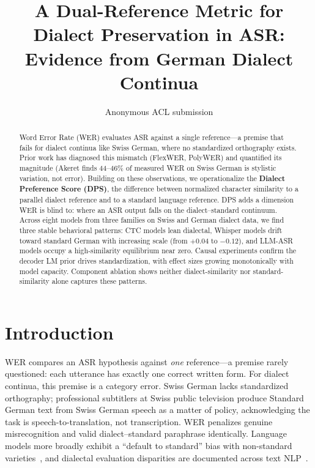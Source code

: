 \documentclass[11pt,a4paper]{article}
\title{A Dual-Reference Metric for Dialect Preservation in {ASR}: \\ Evidence from {German} Dialect Continua}
\author{Anonymous ACL submission}
\begin{document}
\maketitle

\begin{abstract}
Word Error Rate (WER) evaluates ASR against a single reference---a premise that fails for dialect continua like Swiss German, where no standardized orthography exists. Prior work has diagnosed this mismatch (FlexWER, PolyWER) and quantified its magnitude (Akeret finds 44--46\% of measured WER on Swiss German is stylistic variation, not error). Building on these observations, we operationalize the \textbf{Dialect Preference Score (DPS)}, the difference between normalized character similarity to a parallel dialect reference and to a standard language reference. DPS adds a dimension WER is blind to: where an ASR output falls on the dialect--standard continuum. Across eight models from three families on Swiss and German dialect data, we find three stable behavioral patterns: CTC models lean dialectal, Whisper models drift toward standard German with increasing scale (from $+0.04$ to $-0.12$), and LLM-ASR models occupy a high-similarity equilibrium near zero. Causal experiments confirm the decoder LM prior drives standardization, with effect sizes growing monotonically with model capacity. Component ablation shows neither dialect-similarity nor standard-similarity alone captures these patterns.
\end{abstract}

\section{Introduction}

WER compares an ASR hypothesis against \textit{one} reference---a premise rarely questioned: each utterance has exactly one correct written form. For dialect continua, this premise is a category error. Swiss German lacks standardized orthography; professional subtitlers at Swiss public television produce Standard German text from Swiss German speech as a matter of policy, acknowledging the task is speech-to-translation, not transcription. WER penalizes genuine misrecognition and valid dialect--standard paraphrase identically. Language models more broadly exhibit a ``default to standard'' bias with non-standard varieties~, and dialectal evaluation disparities are documented across text NLP~.
\end{document}
